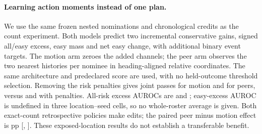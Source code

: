 \paragraph{Learning action moments instead of one plan.}
We use the same frozen nested nominations and chronological credits as
the count experiment. Both models predict two incremental conservative
gains, signed all/easy excess, easy mass and net easy change, with
additional binary event targets. The motion arm zeroes the added
channels; the peer arm observes the two nearest histories per nominee
in heading-aligned relative coordinates. The same architecture and
predeclared score are used, with no held-outcome threshold selection.
Removing the risk penalties gives \DirectCountMotionGain{} joint
passes for motion and \DirectCountPeerGain{} for peers, versus
\DirectCountMotion{} and \DirectCountPeer{} with penalties. All-risk
excess AUROCs are \DirectCountMotionRisk{} and \DirectCountPeerRisk{};
easy-excess AUROC is undefined in three location--seed cells, so no
whole-roster average is given. Both exact-count retrospective policies
make \DirectCountMatchedEdits{} edits; the paired peer minus motion
effect is \DirectCountGap{} pp [\DirectCountLow{}, \DirectCountHigh{}].
These exposed-location results do not establish a transferable benefit.
